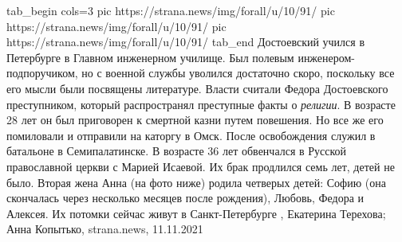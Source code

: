 
\ifcmt
  tab_begin cols=3
     pic https://strana.news/img/forall/u/10/91/%
     pic https://strana.news/img/forall/u/10/91/%
		 pic https://strana.news/img/forall/u/10/91/%
  tab_end
\fi
Достоевский учился в Петербурге в Главном инженерном училище. Был полевым
инженером-подпоручиком, но с военной службы уволился достаточно скоро,
поскольку все его мысли были посвящены литературе.  Власти считали Федора
Достоевского преступником, который распространял преступные факты о
\emph{религии}. В возрасте 28 лет он был приговорен к смертной казни путем
повешения. Но все же его помиловали и отправили на каторгу в Омск.  После
освобождения служил в батальоне в Семипалатинске.  В возрасте 36 лет обвенчался
в Русской православной церкви с Марией Исаевой. Их брак продлился семь лет,
детей не было.  Вторая жена Анна (на фото ниже) родила четверых детей: Софию
(она скончалась через несколько месяцев после рождения), Любовь, Федора и
Алексея. Их потомки сейчас живут в Санкт-Петербурге
, 
Екатерина Терехова; Анна Копытько, strana.news, 11.11.2021
